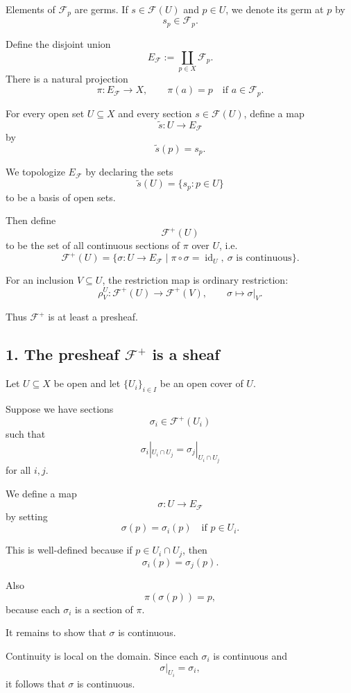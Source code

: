 Elements of $\mathcal F_p$ are germs. If $s \in \mathcal F(U)$ and
$p \in U$, we denote its germ at $p$ by
\[
s_p \in \mathcal F_p.
\]

Define the disjoint union
\[
E_{\mathcal F}
:=
\coprod_{p \in X} \mathcal F_p.
\]
There is a natural projection
\[
\pi : E_{\mathcal F} \longrightarrow X,
\qquad
\pi(a) = p
\quad \text{if } a \in \mathcal F_p.
\]

For every open set $U \subseteq X$ and every section $s \in \mathcal F(U)$,
define a map
\[
\widetilde{s} : U \longrightarrow E_{\mathcal F}
\]
by
\[
\widetilde{s}(p) = s_p.
\]

We topologize $E_{\mathcal F}$ by declaring the sets
\[
\widetilde{s}(U)
=
\{s_p : p \in U\}
\]
to be a basis of open sets.

Then define
\[
\mathcal F^+(U)
\]
to be the set of all continuous sections of $\pi$ over $U$, i.e.
\[
\mathcal F^+(U)
=
\{\sigma : U \to E_{\mathcal F}
\mid \pi \circ \sigma = \operatorname{id}_U,\ \sigma
\text{ is continuous}\}.
\]

For an inclusion $V \subseteq U$, the restriction map is ordinary restriction:
\[
\rho^U_V : \mathcal F^+(U) \longrightarrow \mathcal F^+(V),
\qquad
\sigma \longmapsto \sigma|_V.
\]

Thus $\mathcal F^+$ is at least a presheaf.

\subsection*{1. The presheaf $\mathcal F^+$ is a sheaf}

Let $U \subseteq X$ be open and let $\{U_i\}_{i \in I}$ be an open cover of $U$.

Suppose we have sections
\[
\sigma_i \in \mathcal F^+(U_i)
\]
such that
\[
\sigma_i|_{U_i \cap U_j}
=
\sigma_j|_{U_i \cap U_j}
\]
for all $i,j$.

We define a map
\[
\sigma : U \longrightarrow E_{\mathcal F}
\]
by setting
\[
\sigma(p) = \sigma_i(p)
\quad \text{if } p \in U_i.
\]

This is well-defined because if $p \in U_i \cap U_j$, then
\[
\sigma_i(p) = \sigma_j(p).
\]

Also
\[
\pi(\sigma(p)) = p,
\]
because each $\sigma_i$ is a section of $\pi$.

It remains to show that $\sigma$ is continuous.

Continuity is local on the domain. Since each $\sigma_i$ is continuous and
\[
\sigma|_{U_i} = \sigma_i,
\]
it follows that $\sigma$ is continuous.

